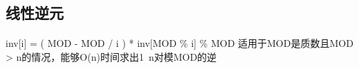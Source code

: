 ﻿\subsection{线性逆元}
\paragraph{}
inv[i] = ( MOD - MOD / i ) * inv[MOD \% i] \% MOD
适用于MOD是质数且MOD > n的情况，能够O(n)时间求出1~n对模MOD的逆
